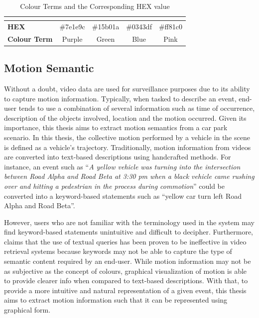 \begin{table}[!ht]
\begin{tabular}{lcccc}
\multicolumn{1}{l|}{}                     & \multicolumn{1}{l|}{\cellcolor[HTML]{7E1E9C}} & \multicolumn{1}{l|}{\cellcolor[HTML]{15B01A}} & \multicolumn{1}{l|}{\cellcolor[HTML]{0343DF}} & \multicolumn{1}{l|}{\cellcolor[HTML]{FF81C0}} \\ \hline
\multicolumn{1}{|l|}{\textbf{HEX}}        & \multicolumn{1}{c|}{\#7e1e9c}                 & \multicolumn{1}{c|}{\#15b01a}                 & \multicolumn{1}{c|}{\#0343df}                 & \multicolumn{1}{c|}{\#ff81c0}                 \\ \hline
\multicolumn{1}{|l|}{\textbf{Colour Term}}  & \multicolumn{1}{c|}{Purple}                   & \multicolumn{1}{c|}{Green}                    & \multicolumn{1}{c|}{Blue}                     & \multicolumn{1}{c|}{Pink}                     \\ \hline
\end{tabular}
\caption{Colour Terms and the Corresponding HEX value}
\label{table:colorshex}
\end{table}



\subsection{Motion Semantic}

Without a doubt, video data are used for surveillance purposes due to its ability to capture motion information.
Typically, when tasked to describe an event, end-user tends to use a combination of several information such as time of occurrence, description of the objects involved, location and the motion occurred.
Given its importance, this thesis aims to extract motion semantics from a car park scenario.
In this thesis, the collective motion performed by a vehicle in the scene is defined as a vehicle's trajectory.
Traditionally, motion information from videos are converted into text-based descriptions using handcrafted methods. For instance, an event such as ``\textit{A yellow vehicle was turning into the intersection between Road Alpha and Road Beta at 3:30 pm when a black vehicle came rushing over and hitting a pedestrian in the process during commotion}'' could be converted into a keyword-based statements such as ``yellow car turn left Road Alpha and Road Beta''.

However, users who are not familiar with the terminology used in the system may find keyword-based statements unintuitive and difficult to decipher.
Furthermore,  claims that the use of textual queries has been proven to be ineffective in video retrieval systems because keywords may not be able to capture the type of semantic content required by an end-user.
While motion information may not be as subjective as the concept of colours, graphical visualization of motion is able to provide clearer info when compared to text-based descriptions.
With that, to provide a more intuitive and natural representation of a given event, this thesis aims to extract motion information such that it can be represented using graphical form.

